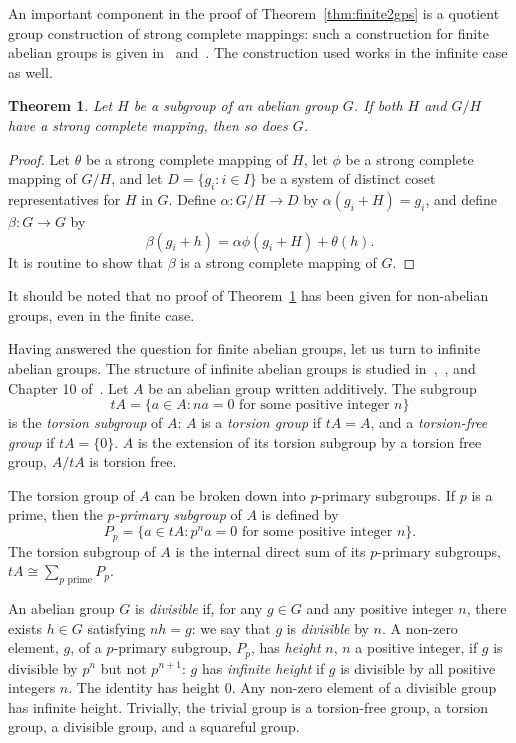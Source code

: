 \documentclass[12pt,a4paper]{article}
\newtheorem{thm}{Theorem}[section]
\begin{document}
An important component in the proof of Theorem~\ref{thm:finite2gps} is a quotient group construction of strong complete mappings: such a construction for finite abelian groups is given in~\cite{Evans:1990} and~\cite{Horton:1990}. The construction used works in the infinite case as well.

\begin{thm}\label{thm:G/H}
Let $H$ be a subgroup of an abelian group $G$. If both $H$ and $G/H$ have a strong complete mapping, then so does $G$.
\end{thm}
\begin{proof}
Let $\theta$ be a strong complete mapping of $H$, let $\phi$ be a strong complete mapping of $G/H$, and let $D=\{g_i : i\in I\}$ be a system of distinct coset representatives for $H$ in $G$. Define $\alpha\colon G/H\to D$ by $\alpha(g_i+H)=g_i$, and define $\beta\colon G\to G$ by 
\[
\beta(g_i+h)=\alpha\phi(g_i+H)+\theta(h).
\]
It is routine to show that $\beta$ is a strong complete mapping of $G$.
\end{proof}

It should be noted that no proof of Theorem~\ref{thm:G/H} has been given for non-abelian groups, even in the finite case.

Having answered the question for finite abelian groups, let us turn to infinite abelian groups. The structure of infinite abelian groups is studied in~\cite{Fuchs:2015},~\cite{Kaplansky:1969}, and Chapter 10 of~\cite{Rotman:1995}. Let $A$ be an abelian group written additively. The subgroup 
\[
tA=\{a\in A : na=0 \text{ for some positive integer $n$}\}
\]
 is the {\em torsion subgroup} of $A$: $A$ is a {\em torsion group} if $tA=A$, and a {\em torsion-free group} if $tA=\{0\}$. $A$ is the extension of its torsion subgroup by a torsion free group, $A/tA$ is torsion free. 
 
 The torsion group of $A$ can be broken down into $p$-primary subgroups. If $p$ is a prime, then the {\em $p$-primary subgroup} of $A$ is defined by 
\[
P_p=\{a\in tA : p^na=0\text{ for some positive integer $n$}\}.
\]
 The torsion subgroup of $A$ is the internal direct sum of its $p$-primary subgroups, $tA\cong\sum_{p\text{ prime}}P_p$.
 
 An abelian group $G$ is {\em divisible} if, for any $g\in G$ and any positive integer $n$, there exists $h\in G$ satisfying $nh=g$: we say that $g$ is {\em divisible} by $n$. A non-zero element, $g$, of a $p$-primary subgroup, $P_p$, has {\em height} $n$, $n$ a positive integer, if $g$ is divisible by $p^n$ but not $p^{n+1}$: $g$ has {\em infinite height} if $g$ is divisible by all positive integers $n$. The identity has height $0$. Any non-zero element of a divisible group has infinite height. Trivially, the trivial group is a torsion-free group, a torsion group, a divisible group, and a squareful group.
 
\end{document}
